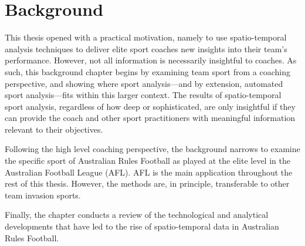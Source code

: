\chapter{Background}
\label{ch:background}
\startchapter

This thesis opened with a practical motivation, namely to use \gls{spatio-temporal} analysis techniques to deliver elite sport coaches new insights into their team's performance. However, not all information is necessarily insightful to coaches. As such, this background chapter begins by examining team sport from a coaching perspective, and showing where sport analysis---and by extension, automated sport analysis---fits within this larger context. The results of spatio-temporal sport analysis, regardless of how deep or sophisticated, are only insightful if they can provide the coach and other sport practitioners with meaningful information relevant to their objectives.

Following the high level coaching perspective, the background narrows to examine the specific sport of Australian Rules Football as played at the elite level in the Australian Football League (AFL). AFL is the main application throughout the rest of this thesis. However, the methods are, in principle, transferable to other team invasion sports.

Finally, the chapter conducts a review of the technological and analytical developments that have led to the rise of spatio-temporal data in Australian Rules Football.
